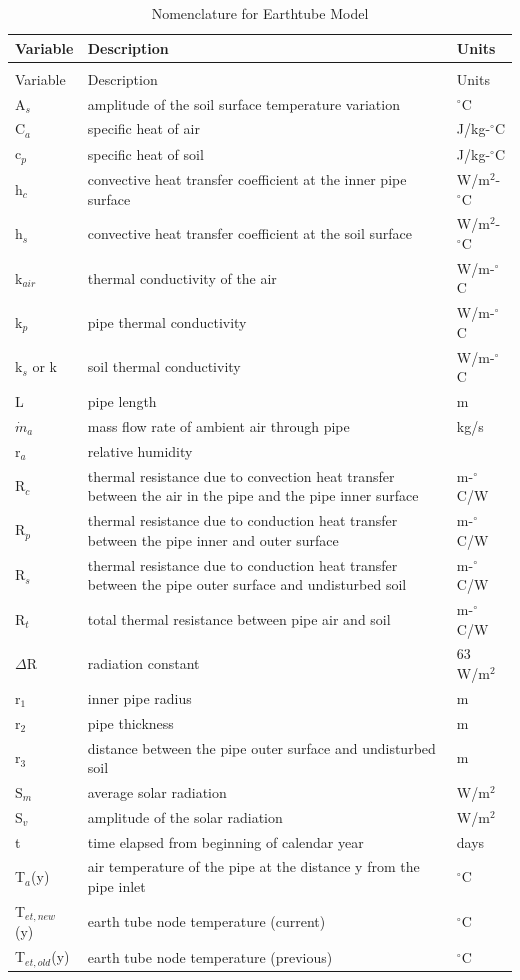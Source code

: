 \begin{longtable}[c]{p{1.5in}p{3.0in}p{1.5in}}
\caption{Nomenclature for Earthtube Model \label{table:nomenclature-for-earthtube-model}} \tabularnewline
\toprule
Variable & Description & Units \tabularnewline
\midrule
\endfirsthead

\caption[]{Nomenclature for Earthtube Model} \tabularnewline
\toprule
Variable & Description & Units \tabularnewline
\midrule
\endhead

A\(_{s}\) & amplitude of the soil surface temperature variation & \(^{\circ}\)C \tabularnewline
C\(_{a}\) & specific heat of air & J/kg-\(^{\circ}\)C \tabularnewline
c\(_{p}\) & specific heat of soil & J/kg-\(^{\circ}\)C \tabularnewline
h\(_{c}\) & convective heat transfer coefficient at the inner pipe surface & W/m\(^{2}\)-\(^{\circ}\)C \tabularnewline
h\(_{s}\) & convective heat transfer coefficient at the soil surface & W/m\(^{2}\)-\(^{\circ}\)C \tabularnewline
k\(_{air}\) & thermal conductivity of the air & W/m-\(^{\circ}\)C \tabularnewline
k\(_{p}\) & pipe thermal conductivity & W/m-\(^{\circ}\)C \tabularnewline
k\(_{s}\) or k & soil thermal conductivity & W/m-\(^{\circ}\)C \tabularnewline
L & pipe length & m \tabularnewline
\(\dot m_a\) & mass flow rate of ambient air through pipe & kg/s \tabularnewline
r\(_{a}\) & relative humidity & ~ \tabularnewline
R\(_{c}\) & thermal resistance due to convection heat transfer between the air in the pipe and the pipe inner surface & m-\(^{\circ}\)C/W \tabularnewline
R\(_{p}\) & thermal resistance due to conduction heat transfer between the pipe inner and outer surface & m-\(^{\circ}\)C/W \tabularnewline
R\(_{s}\) & thermal resistance due to conduction heat transfer between the pipe outer surface and undisturbed soil & m-\(^{\circ}\)C/W \tabularnewline
R\(_{t}\) & total thermal resistance between pipe air and soil & m-\(^{\circ}\)C/W \tabularnewline
\({\Delta}\)R & radiation constant & 63 W/m\(^{2}\) \tabularnewline
r\(_{1}\) & inner pipe radius & m \tabularnewline
r\(_{2}\) & pipe thickness & m \tabularnewline
r\(_{3}\) & distance between the pipe outer surface and undisturbed soil & m \tabularnewline
S\(_{m}\) & average solar radiation & W/m\(^{2}\) \tabularnewline
S\(_{v}\) & amplitude of the solar radiation & W/m\(^{2}\) \tabularnewline
t & time elapsed from beginning of calendar year & days \tabularnewline
T\(_{a}\)(y) & air temperature of the pipe at the distance y from the pipe inlet & \(^{\circ}\)C \tabularnewline
T\(_{et,new}\)(y) & earth tube node temperature (current) & \(^{\circ}\)C \tabularnewline
T\(_{et,old}\)(y) & earth tube node temperature (previous) & \(^{\circ}\)C \tabularnewline

\end{longtable}
